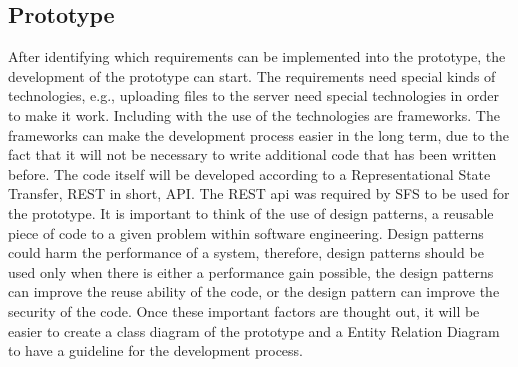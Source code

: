 \documentclass[paper=a4, fontsize=11pt,twoside]{scrartcl}	%
\begin{document}
\subsection{Prototype}
After identifying which requirements can be implemented into the prototype, the development of the prototype can start. The requirements need special kinds of technologies, e.g., uploading files to the server need special technologies in order to make it work. Including with the use of the technologies are frameworks. The frameworks can make the development process easier in the long term, due to the fact that it will not be necessary to write additional code that has been written before. The code itself will be developed according to a Representational State Transfer, REST in short, API. The REST api was required by SFS to be used for the prototype. It is important to think of the use of design patterns, a reusable piece of code to a given problem within software engineering. Design patterns could harm the performance of a system, therefore, design patterns should be used only when there is either a performance gain possible, the design patterns can improve the reuse ability of the code, or the design pattern can improve the security of the code. Once these important factors are thought out, it will be easier to create a class diagram of the prototype and a Entity Relation Diagram to have a guideline for the development process. \\ 
\end{document}
